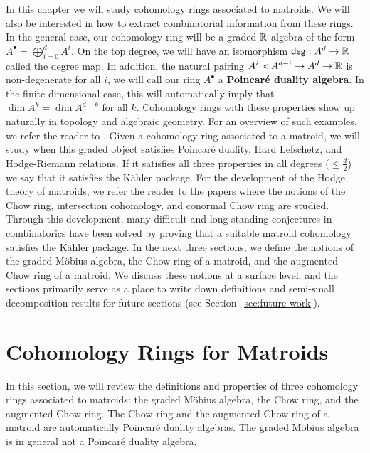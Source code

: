 \documentclass{puthesis-UG}
\begin{document}
In this chapter we will study cohomology rings associated to matroids. We will also be interested in how to extract combinatorial information from these rings. In the general case, our cohomology ring will be a graded $\mathbb{R}$-algebra of the form $A^\bullet = \bigoplus_{i = 0}^d A^i$. On the top degree, we will have an isomorphism $\mathsf{deg} : A^d \to \mathbb{R}$ called the degree map. In addition, the natural pairing $A^i \times A^{d-i} \to A^d \to \mathbb{R}$ is non-degenerate for all $i$, we will call our ring $A^\bullet$ a \textbf{Poincar\'e duality algebra}. In the finite dimensional case, this will automatically imply that $\dim A^k = \dim A^{d-k}$ for all $k$. Cohomology rings with these properties show up naturally in topology and algebraic geometry. For an overview of such examples, we refer the reader to \cite{Huh2016TropicalGO}. Given a cohomology ring associated to a matroid, we will study when this graded object satisfies Poincar\'e duality, Hard Lefschetz, and Hodge-Riemann relations. If it satisfies all three properties in all degrees ($\leq \frac{d}{2}$) we say that it satisfies the K\"ahler package. For the development of the Hodge theory of matroids, we refer the reader to the papers \cite{AHK,huh-semi-small,ardila2022lagrangian,eur2022stellahedral,Feichtner_2004} where the notions of the Chow ring, intersection cohomology, and conormal Chow ring are studied. Through this development, many difficult and long standing conjectures in combinatorics have been solved by proving that a suitable matroid cohomology satisfies the K\"ahler package. In the next three sections, we define the notions of the graded M\"obius algebra, the Chow ring of a matroid, and the augmented Chow ring of a matroid. We discuss these notions at a surface level, and the sections primarily serve as a place to write down definitions and semi-small decomposition results for future sections (see Section~\ref{sec:future-work}).

\section{Cohomology Rings for Matroids} \label{sec:cohomology-rings-for-matroids}
	
In this section, we will review the definitions and properties of three cohomology rings associated to matroids: the graded M\"obius algebra, the Chow ring, and the augmented Chow ring. The Chow ring and the augmented Chow ring of a matroid are automatically Poincar\'e duality algebras. The graded M\"obius algebra is in general not a Poincar\'e duality algebra. 
\end{document}
